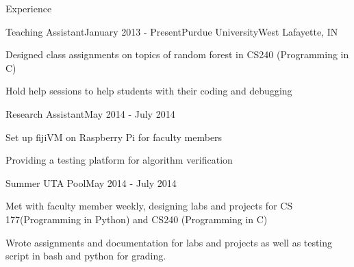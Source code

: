 \documentclass{resume} %
\begin{document}
\begin{rSection}{Experience}

\begin{rSubsection}{Teaching Assistant}{January 2013 - Present}{Purdue University}{West Lafayette, IN}
\item Designed class assignments on topics of random forest in CS240 (Programming in C)
\item Hold help sessions to help students with their coding and debugging
\end{rSubsection}


\begin{rSubsection}{Research Assistant}{May 2014 - July 2014}{}{}
\item Set up fijiVM on Raspberry Pi for faculty members
\item Providing a testing platform for algorithm verification 
\end{rSubsection}


\begin{rSubsection}{Summer UTA Pool}{May 2014 - July 2014}{}{}
\item Met with faculty member weekly, designing labs and projects for CS 177(Programming in Python) and CS240 (Programming in C)
\item Wrote assignments and documentation for labs and projects as well as testing script in bash and python for grading.
\end{rSubsection}

\end{rSection}


\end{document}
